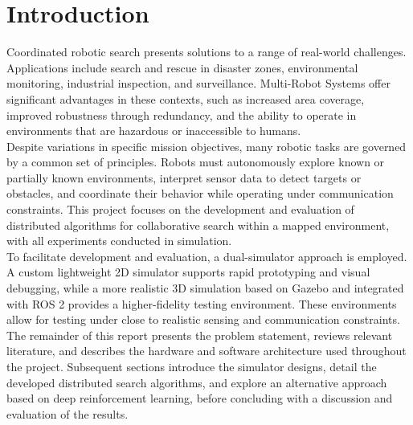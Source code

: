 \section{Introduction}
\label{sec:Introduction}
Coordinated robotic search presents solutions to a range of real-world challenges.
Applications include search and rescue in disaster zones, environmental monitoring, industrial inspection, and surveillance. 
Multi-Robot Systems offer significant advantages in these contexts, such as increased area coverage, improved robustness through redundancy, and the ability to operate in environments that are hazardous or inaccessible to humans.\\

Despite variations in specific mission objectives, many robotic tasks are governed by a common set of principles. 
Robots must autonomously explore known or partially known environments, interpret sensor data to detect targets or obstacles, and coordinate their behavior while operating under communication constraints. 
This project focuses on the development and evaluation of distributed algorithms for collaborative search within a mapped environment, with all experiments conducted in simulation.\\

To facilitate development and evaluation, a dual-simulator approach is employed. 
A custom lightweight 2D simulator supports rapid prototyping and visual debugging, while a more realistic 3D simulation based on Gazebo and integrated with ROS 2 provides a higher-fidelity testing environment. 
These environments allow for testing under close to realistic sensing and communication constraints.\\

The remainder of this report presents the problem statement, reviews relevant literature, and describes the hardware and software architecture used throughout the project. 
Subsequent sections introduce the simulator designs, detail the developed distributed search algorithms, and explore an alternative approach based on deep reinforcement learning, before concluding with a discussion and evaluation of the results.
